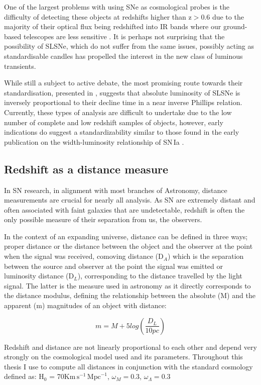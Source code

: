 One of the largest problems with using SNe as cosmological probes is the difficulty of detecting these objects at redshifts higher than z$>$0.6 due to the majority of their optical flux being redshifted into IR bands where our ground-based telescopes are less sensitive \citep{Smith2018}. It is perhaps not surprising that the possibility of SLSNe, which do not suffer from the same issues, possibly acting as standardisable candles \citep{Inserra2014,Papadopoulos2015,Inserra2018a} has propelled the interest in the new class of luminous transients.

While still a subject to active debate, the most promising route towards their standardisation, presented in \citet{Inserra2018a}, suggests that absolute luminosity of SLSNe is inversely proportional to their decline time in a near inverse Phillips relation. Currently, these types of analysis are difficult to undertake due to the low number of complete and low redshift samples of objects, however, early indications do suggest a standardizability similar to those found in the early publication on the width-luminosity relationship of SN\,Ia \citep{Inserra2018a}.

\subsection{Redshift as a distance measure}
In SN research, in alignment with most branches of Astronomy, distance measurements are crucial for nearly all analysis. As SN are extremely distant and often associated with faint galaxies that are undetectable, redshift is often the only possible measure of their separation from us, the observers.

In the context of an expanding universe, distance can be defined in three ways; proper distance or the distance between the object and the observer at the point when the signal was received, comoving distance (D$_A$) which is the separation between the source and observer at the point the signal was emitted or luminosity distance (D$_L$), corresponding to the distance travelled by the light signal. The latter is the measure used in astronomy as it directly corresponds to the distance modulus, defining the relationship between the absolute (M) and the apparent (m) magnitudes of an object with distance:

\begin{equation}
  m = M + 5log(\frac{D_L}{10pc})
\end{equation}

Redshift and distance are not linearly proportional to each other and depend very strongly on the cosmological model used and its parameters. Throughout this thesis I use  to compute all distances in conjunction with the standard cosmology defined as: H$_0$ = 70$\mathrm{Km}\,\mathrm{s}^{-1}\,\mathrm{Mpc}^{-1}$, $\omega_M = 0.3$, $\omega_{\Lambda} = 0.3$

